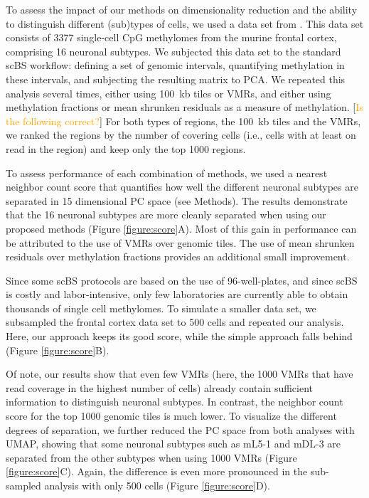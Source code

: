 \documentclass[twocolumn,10pt]{article}
\newcommand{\todo}[1]{[\textcolor{orange}{#1}]}
\begin{document}
To assess the impact of our methods on dimensionality reduction and the ability to distinguish different (sub)types of cells, we used a data set from \citet{luo2017single}. This data set consists of 3377 single-cell CpG methylomes from the murine frontal cortex, comprising 16 neuronal subtypes.
We subjected this data set to the standard scBS workflow: defining a set of genomic intervals, quantifying methylation in these intervals, and subjecting the resulting matrix to PCA.
We repeated this analysis several times, either using 100~kb tiles or VMRs, and either using methylation fractions or mean shrunken residuals as a measure of methylation. \todo{Is the following correct?} For both types of regions, the 100~kb tiles and the VMRs, we ranked the regions by the number of covering cells (i.e., cells with at least on read in the region) and keep only the top 1000 regions.

To assess performance of each combination of methods, we used a nearest neighbor count score that quantifies how well the different neuronal subtypes are separated in 15 dimensional PC space (see Methods).
The results demonstrate that the 16 neuronal subtypes are more cleanly separated when using our proposed methods (Figure \ref{figure:score}A).
Most of this gain in performance can be attributed to the use of VMRs over genomic tiles. The use of mean shrunken residuals over methylation fractions provides an additional small improvement.

Since some scBS protocols are based on the use of 96-well-plates, and since scBS is costly and labor-intensive, only few laboratories are currently able to obtain thousands of single cell methylomes.
To simulate a smaller data set, we subsampled the frontal cortex data set to 500 cells and repeated our analysis.
Here, our approach keeps its good score, while the simple approach falls behind (Figure \ref{figure:score}B).

Of note, our results show that even few VMRs (here, the 1000 VMRs that have read coverage in the highest number of cells) already contain sufficient information to distinguish neuronal subtypes.
In contrast, the neighbor count score for the top 1000 genomic tiles is much lower.
To visualize the different degrees of separation, we further reduced the PC space from both analyses with UMAP, showing that some neuronal subtypes such as mL5-1 and mDL-3 are separated from the other subtypes when using 1000 VMRs (Figure \ref{figure:score}C).
Again, the difference is even more pronounced in the sub-sampled analysis with only 500 cells (Figure \ref{figure:score}D).
\end{document}
